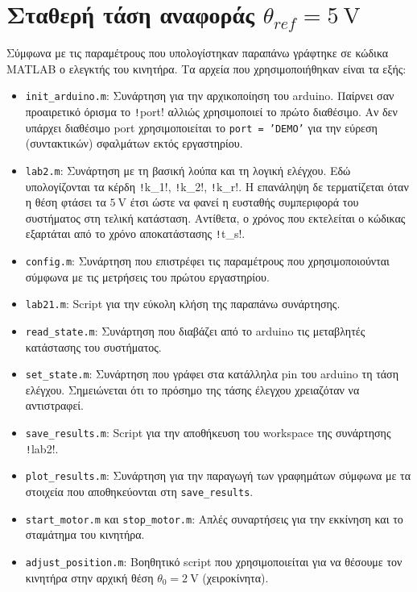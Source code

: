 \section[Σταθερή τάση αναφοράς]{Σταθερή τάση αναφοράς $\theta_{ref} = \SI{5}{\volt}$}
Σύμφωνα με τις παραμέτρους που υπολογίστηκαν παραπάνω γράφτηκε σε κώδικα MATLAB ο ελεγκτής του κινητήρα.
Τα αρχεία που χρησιμοποιήθηκαν είναι τα εξής:
\begin{itemize}
\item \texttt{init\_arduino.m}: Συνάρτηση για την αρχικοποίηση του arduino.
  Παίρνει σαν προαιρετικό όρισμα το \texttt!port! αλλιώς χρησιμοποιεί το πρώτο διαθέσιμο.
  Αν δεν υπάρχει διαθέσιμο port χρησιμοποιείται το \texttt{port = 'DEMO'} για την εύρεση (συντακτικών)
  σφαλμάτων εκτός εργαστηρίου.

\item \texttt{lab2.m}: Συνάρτηση με τη βασική λούπα και τη λογική ελέγχου.
  Εδώ υπολογίζονται τα κέρδη \texttt!k_1!, \texttt!k_2!, \texttt!k_r!.
  Η επανάληψη δε τερματίζεται όταν η θέση φτάσει τα $\SI{5}{\volt}$ έτσι ώστε να φανεί η ευσταθής συμπεριφορά του συστήματος στη τελική κατάσταση.
  Αντίθετα, ο χρόνος που εκτελείται ο κώδικας εξαρτάται από το χρόνο αποκατάστασης \texttt!t_s!.

\item \texttt{config.m}: Συνάρτηση που επιστρέφει τις παραμέτρους που χρησιμοποιούνται σύμφωνα με τις μετρήσεις του πρώτου εργαστηρίου.

\item \texttt{lab21.m}: Script για την εύκολη κλήση της παραπάνω συνάρτησης.

\item \texttt{read\_state.m}: Συνάρτηση που διαβάζει από το arduino τις μεταβλητές κατάστασης του συστήματος.

\item \texttt{set\_state.m}: Συνάρτηση που γράφει στα κατάλληλα pin του arduino τη τάση ελέγχου.
  Σημειώνεται ότι το πρόσημο της τάσης έλεγχου χρειαζόταν να αντιστραφεί.

\item \texttt{save\_results.m}: Script για την αποθήκευση του workspace της συνάρτησης \texttt!lab2!.

\item \texttt{plot\_results.m}: Συνάρτηση για την παραγωγή των γραφημάτων σύμφωνα με τα στοιχεία που αποθηκεύονται στη \texttt{save\_results}.

\item \texttt{start\_motor.m} και \texttt{stop\_motor.m}: Απλές συναρτήσεις για την εκκίνηση και το σταμάτημα του κινητήρα.

\item \texttt{adjust\_position.m}: Βοηθητικό script που χρησιμοποιείται για να θέσουμε τον κινητήρα στην αρχική θέση $\theta_0 = \SI{2}{\volt}$ (χειροκίνητα).
\end{itemize}


